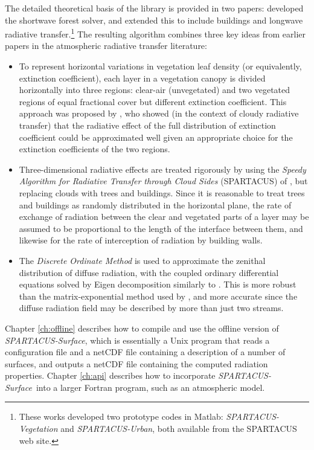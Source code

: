 \documentclass[a4,oneside]{article}
\def\spsurf{\emph{SPARTACUS-Surface}}
\begin{document}
The detailed theoretical basis of the library is provided in two
papers: \cite{Hogan+2018} developed the shortwave forest solver, and
\cite{Hogan2019} extended this to include buildings and longwave
radiative transfer.\footnote{These works developed two prototype codes
  in Matlab: \emph{SPARTACUS-Vegetation} and \emph{SPARTACUS-Urban},
  both available from the SPARTACUS web site.}  The resulting
algorithm combines three key ideas from earlier papers in the
atmospheric radiative transfer literature:
%
\begin{itemize}
\item To represent horizontal variations in vegetation leaf density
  (or equivalently, extinction coefficient), each layer in a
  vegetation canopy is divided horizontally into three regions:
  clear-air (unvegetated) and two vegetated regions of equal
  fractional cover but different extinction coefficient.  This
  approach was proposed by \cite{Shonk+2008}, who showed (in the
  context of cloudy radiative transfer) that the radiative effect of
  the full distribution of extinction coefficient could be
  approximated well given an appropriate choice for the extinction
  coefficients of the two regions.
\item Three-dimensional radiative effects are treated rigorously by
  using the \emph{Speedy Algorithm for Radiative Transfer through
    Cloud Sides} (SPARTACUS) of \cite{Hogan+2016}, but replacing
  clouds with trees and buildings.  Since it is reasonable to treat
  trees and buildings as randomly distributed in the horizontal plane,
  the rate of exchange of radiation between the clear and vegetated
  parts of a layer may be assumed to be proportional to the length of
  the interface between them, and likewise for the rate of
  interception of radiation by building walls.
\item The \emph{Discrete Ordinate Method} is used to approximate the
  zenithal distribution of diffuse radiation, with the coupled
  ordinary differential equations solved by Eigen decomposition
  similarly to \cite{Stamnes+1989}. This is more robust than the
  matrix-exponential method used by \cite{Hogan+2016}, and more
  accurate since the diffuse radiation field may be described by more
  than just two streams.
\end{itemize}

Chapter \ref{ch:offline} describes how to compile and use the offline
version of \spsurf, which is essentially a Unix program that reads a
configuration file and a netCDF file containing a description of a
number of surfaces, and outputs a netCDF file containing the computed
radiation properties. Chapter \ref{ch:api} describes how to incorporate
\spsurf\ into a larger Fortran program, such as an atmospheric model.
\end{document}
